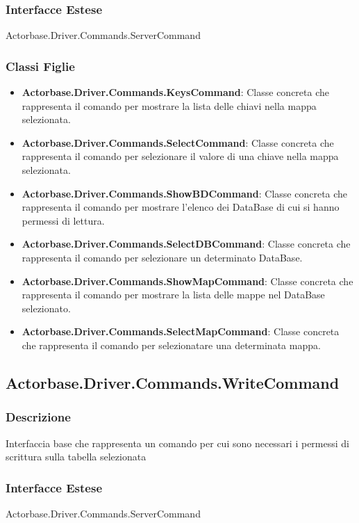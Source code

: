 \documentclass[a4paper]{article}
\begin{document}
				\subsubsection{Interfacce Estese} Actorbase.Driver.Commands.ServerCommand
				\subsubsection{Classi Figlie}
					\begin{itemize}
						\item \textbf{Actorbase.Driver.Commands.KeysCommand}:
							Classe concreta che rappresenta il comando per mostrare la lista delle chiavi nella mappa selezionata.
						\item \textbf{Actorbase.Driver.Commands.SelectCommand}:
							Classe concreta che rappresenta il comando per selezionare il valore di una chiave nella mappa selezionata.
						\item \textbf{Actorbase.Driver.Commands.ShowBDCommand}:
							Classe concreta che rappresenta il comando per mostrare l'elenco dei DataBase di cui si hanno permessi di lettura.
						\item \textbf{Actorbase.Driver.Commands.SelectDBCommand}:
							Classe concreta che rappresenta il comando per selezionare un determinato DataBase.
						\item \textbf{Actorbase.Driver.Commands.ShowMapCommand}:
							Classe concreta che rappresenta il comando per mostrare la lista delle mappe nel DataBase selezionato.
						\item \textbf{Actorbase.Driver.Commands.SelectMapCommand}:
							Classe concreta che rappresenta il comando per selezionatare una determinata mappa.
					\end{itemize}


		\subsection{Actorbase.Driver.Commands.WriteCommand}
			\subsubsection{Descrizione} Interfaccia base che rappresenta un comando per cui sono necessari i permessi di scrittura sulla tabella selezionata
			\subsubsection{Interfacce Estese} Actorbase.Driver.Commands.ServerCommand
\end{document}
